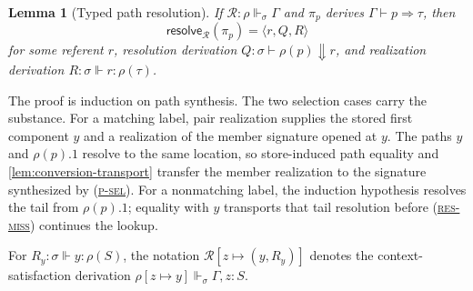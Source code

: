 \documentclass[acmsmall,screen,nonacm]{acmart}
\newtheorem{lemma}[theorem]{Lemma}
\newcommand{\ruleref}[1]{%
  \textsc{(\hyperref[rule:#1]{#1})}}
\newcommand{\resolve}{\Downarrow}
\newcommand{\realizes}{\Vdash}
\newcommand{\resolvepi}[2]{\mathsf{resolve}_{#1}(#2)}
\begin{document}
\begin{lemma}[Typed path resolution]
\label{lem:typed-resolution}
If \(\mathcal R:\rho\realizes_\sigma\Gamma\) and
\(\pi_p\) derives \(\Gamma\vdash p\Rightarrow\tau\), then
\[
  \resolvepi{\mathcal R}{\pi_p}=\langle r,Q,R\rangle
\]
for some referent \(r\), resolution derivation
\(Q:\sigma\vdash\rho(p)\resolve r\), and realization derivation
\(R:\sigma\realizes r:\rho(\tau)\).
\end{lemma}

The proof is induction on path synthesis. The two selection cases carry
the substance. For a matching label, pair realization supplies the stored
first component \(y\) and a realization of the member signature opened at
\(y\). The paths \(y\) and \(\rho(p).1\) resolve to the same location, so
store-induced path equality and \cref{lem:conversion-transport} transfer the
member realization to the signature synthesized by \ruleref{p-sel}. For a
nonmatching label, the induction hypothesis resolves the tail from
\(\rho(p).1\); equality with \(y\) transports that tail resolution before
\ruleref{res-miss} continues the lookup.

For \(R_y:\sigma\realizes y:\rho(S)\), the notation
\(\mathcal R[z\mapsto(y,R_y)]\) denotes the context-satisfaction derivation
\(\rho[z\mapsto y]\realizes_\sigma\Gamma,z:S\).
\end{document}

